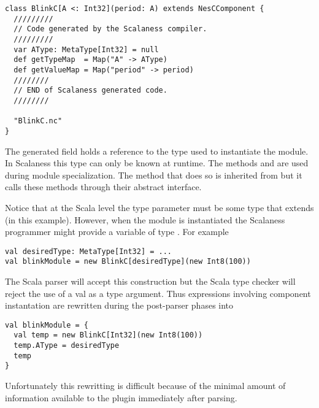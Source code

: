 \singlespace
\begin{lstlisting}[language=scalaness]
class BlinkC[A <: Int32](period: A) extends NesCComponent {
  /////////
  // Code generated by the Scalaness compiler.
  /////////
  var AType: MetaType[Int32] = null
  def getTypeMap  = Map("A" -> AType)
  def getValueMap = Map("period" -> period)
  ////////
  // END of Scalaness generated code.
  ////////

  "BlinkC.nc"
}
\end{lstlisting}
\primaryspacing

The generated field  holds a reference to the type used to instantiate the
module. In Scalaness this type can only be known at runtime. The methods 
and  are used during module specialization. The method that does so is
inherited from  but it calls these methods through their abstract
interface.

Notice that at the Scala level the type parameter must be some type that extends
 (in this example). However, when the module is instantiated the
Scalaness programmer might provide a variable of type . For example

\singlespace
\begin{lstlisting}[language=scalaness]
val desiredType: MetaType[Int32] = ...
val blinkModule = new BlinkC[desiredType](new Int8(100))
\end{lstlisting}
\primaryspacing

The Scala parser will accept this construction but the Scala type checker will reject the use of
a val as a type argument. Thus expressions involving component instantation are rewritten during
the post-parser phases into

\singlespace
\begin{lstlisting}[language=scalaness]
val blinkModule = {
  val temp = new BlinkC[Int32](new Int8(100))
  temp.AType = desiredType
  temp
}
\end{lstlisting}
\primaryspacing

Unfortunately this rewritting is difficult because of the minimal amount of information
available to the plugin immediately after parsing.


